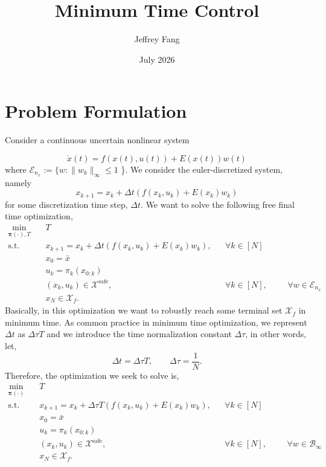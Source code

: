 \documentclass{article}
\title{Minimum Time Control}
\author{Jeffrey Fang}
\date{July 2026}
\begin{document}
\section{Problem Formulation}

Consider a continuous uncertain nonlinear system

\begin{equation}
    \dot x(t) = f(x(t), u(t)) + E(x(t)) w(t)
\end{equation}
where $\mathcal{E}_{n_x} := \{ w: \|w_k\|_\infty \leq 1$ \}. We consider the euler-discretized system, namely
\begin{equation}
    x_{k+1} = x_k + \Delta t \left(f(x_k, u_k) + E(x_k)w_k\right)
\end{equation}
for some discretization time step, $\Delta t$. We want to solve the following free final time optimization,
\begin{subequations}
    \begin{align}
        \min_{\mathbf{\pi}(\cdot), T} \quad & T \\
        \text{s.t.} \quad &  x_{k+1} = x_k + \Delta t \left(f(x_k, u_k) + E(x_k)w_k \right), && \forall k \in [N] \\
        & x_0 = \bar{x} \\
        & u_k = \pi_k(x_{0:k}) \\
        & (x_k, u_k) \in \mathcal{X}^\text{safe}, && \forall k \in [N], &&& \forall w \in \mathcal{E}_{n_x} \\
        & x_N \in \mathcal{X}_f.
    \end{align}
\end{subequations}
Basically, in this optimization we want to robustly reach some terminal set $\mathcal{X}_f$ in minimum time. As common practice in minimum time optimization, we represent $\Delta t$ as $\Delta \tau T$ and we introduce the time normalization constant $\Delta \tau$, in other words, let,
\begin{equation}
    \Delta t = \Delta \tau T, \qquad \Delta \tau = \frac{1}{N}.
\end{equation}
Therefore, the optimization we seek to solve is, 
\begin{subequations}
    \begin{align}
        \min_{\mathbf{\pi}(\cdot)} \quad & T \\
        \text{s.t.} \quad &  x_{k+1} = x_k + \Delta \tau T \left(f(x_k, u_k) + E(x_k)w_k \right), && \forall k \in [N] \\
        & x_0 = \bar{x} \\
        & u_k = \pi_k(x_{0:k}) \\
        & (x_k, u_k) \in \mathcal{X}^\text{safe}, && \forall k \in [N], &&& \forall w \in \mathcal{B}_\infty \\
        & x_N \in \mathcal{X}_f.
    \end{align}
\end{subequations}
\end{document}
